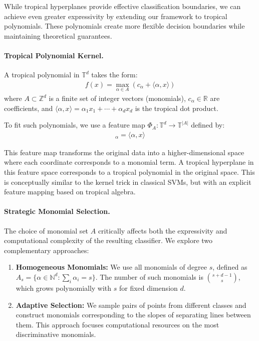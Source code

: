 \documentclass{article}
\newcommand{\R}{\mathbb{R}}
\newcommand{\trop}{\mathbb{T}}
\begin{document}
While tropical hyperplanes provide effective classification boundaries, we can achieve even greater expressivity by extending our framework to tropical polynomials. These polynomials create more flexible decision boundaries while maintaining theoretical guarantees.

\paragraph{Tropical Polynomial Kernel.}
A tropical polynomial in $\trop^d$ takes the form:
\begin{align}
f(x) = \max_{\alpha \in A} (c_\alpha + \langle \alpha, x \rangle)
\end{align}
where $A \subset \mathbb{Z}^d$ is a finite set of integer vectors (monomials), $c_\alpha \in \R$ are coefficients, and $\langle \alpha, x \rangle = \alpha_1 x_1 + \cdots + \alpha_d x_d$ is the tropical dot product.

To fit such polynomials, we use a feature map $\Phi_A: \trop^d \to \trop^{|A|}$ defined by:
\begin{align}
[\Phi_A(x)]_\alpha = \langle \alpha, x \rangle
\end{align}

This feature map transforms the original data into a higher-dimensional space where each coordinate corresponds to a monomial term. A tropical hyperplane in this feature space corresponds to a tropical polynomial in the original space. This is conceptually similar to the kernel trick in classical SVMs, but with an explicit feature mapping based on tropical algebra.

\paragraph{Strategic Monomial Selection.}
The choice of monomial set $A$ critically affects both the expressivity and computational complexity of the resulting classifier. We explore two complementary approaches:

\begin{enumerate}
    \item \textbf{Homogeneous Monomials:} We use all monomials of degree $s$, defined as 
    $A_s = \{\alpha \in \mathbb{N}^d : \sum_i \alpha_i = s\}$. The number of such monomials is $\binom{s+d-1}{s}$, which grows polynomially with $s$ for fixed dimension $d$.
    
    \item \textbf{Adaptive Selection:} We sample pairs of points from different classes and construct monomials corresponding to the slopes of separating lines between them. This approach focuses computational resources on the most discriminative monomials.
\end{enumerate}
\end{document}
